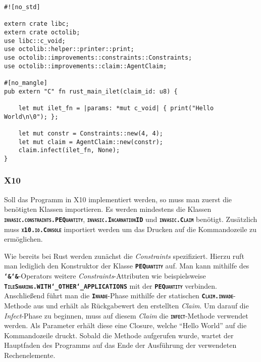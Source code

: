 \lstset{basicstyle=\tiny}
\begin{lstlisting}[float,caption={Minimales Invade, Infect, Retreat in Rust},label=code:rust_minimal_infect]
#![no_std]

extern crate libc;
extern crate octolib;
use libc::c_void;
use octolib::helper::printer::print;
use octolib::improvements::constraints::Constraints;
use octolib::improvements::claim::AgentClaim;

#[no_mangle]
pub extern "C" fn rust_main_ilet(claim_id: u8) {

    let mut ilet_fn = |params: *mut c_void| { print("Hello World\n\0"); };
    
    let mut constr = Constraints::new(4, 4);
    let mut claim = AgentClaim::new(constr);
    claim.infect(ilet_fn, None);
}
\end{lstlisting}
\lstset{basicstyle=\normalsize}

\subsubsection{X10}

Soll das Programm in X10 implementiert werden, so muss man zuerst die benötigten Klassen importieren. Es werden 
mindestens die Klassen \texttt{\textsc{\textbf{invasic.constraints.PEQuantity}}},
\texttt{\textsc{\textbf{invasic.IncarnationID}}} und \texttt{\textsc{\textbf{invasic.Claim}}}
benötigt. Zusätzlich muss \texttt{\textsc{\textbf{x10.io.Console}}} importiert werden
um das Drucken auf die Kommandozeile zu ermöglichen.

Wie bereits bei Rust werden zunächst die \textit{Constraints} spezifiziert. Hierzu
ruft man lediglich den Konstruktor der Klasse \texttt{\textsc{\textbf{PEQuantity}}} auf. Man kann mithilfe
des \texttt{\textsc{\textbf{\char`&\char`&}}}-Operators weitere \textit{Constraints}-Attributen wie
beispielsweise \texttt{\textsc{\textbf{TileSharing.WITH\char`_OTHER\char`_APPLICATIONS}}} mit der
\texttt{\textsc{\textbf{PEQuantity}}} verbinden.
Anschließend führt man die \texttt{\textsc{\textbf{Invade}}}-Phase mithilfe der statischen
\texttt{\textsc{\textbf{Claim.invade}}}-Methode aus und erhält als Rückgabewert den erstellten \textit{Claim}.
Um darauf die \textit{Infect}-Phase zu beginnen, muss auf diesem \textit{Claim} die
\texttt{\textsc{\textbf{infect}}}-Methode verwendet werden.
Als Parameter erhält diese eine Closure, welche "`Hello World"' auf die Kommandozeile druckt.
Sobald die Methode aufgerufen wurde, wartet der Hauptfaden des Programms auf das Ende der Ausführung der
verwendeten Rechenelemente.

